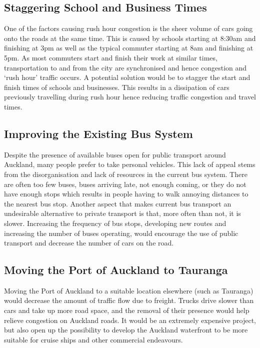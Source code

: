 \documentclass[twoside, a4paper, 11pt]{article}
\begin{document}
\subsection{Staggering School and Business Times}
One of the factors causing rush hour congestion is the sheer volume of cars going onto the roads at the same time. This is caused by schools starting at 8:30am and finishing at 3pm as well as the typical commuter starting at 8am and finishing at 5pm. As most commuters start and finish their work at similar times, transportation to and from the city are synchronised and hence congestion and `rush hour' traffic occurs. A potential solution would be to stagger the start and finish times of schools and businesses. This results in a dissipation of cars previously travelling during rush hour hence reducing traffic congestion and travel times.

\subsection{Improving the Existing Bus System}
Despite the presence of available buses open for public transport around Auckland, many people prefer to take personal vehicles. This lack of appeal stems from the disorganisation and lack of resources in the current bus system. There are often too few buses, buses arriving late, not enough coming, or they do not have enough stops which results in people having to walk annoying distances to the nearest bus stop. Another aspect that makes current bus transport an undesirable alternative to private transport is that, more often than not, it is slower. Increasing the frequency of bus stops, developing new routes and increasing the number of buses operating, would encourage the use of public transport and decrease the number of cars on the road. 
 
\subsection{Moving the Port of Auckland to Tauranga}
Moving the Port of Auckland to a suitable location elsewhere (such as Tauranga) would decrease the amount of traffic flow due to freight. Trucks drive slower than cars and take up more road space, and the removal of their presence would help relieve congestion on Auckland roads. It would be an extremely expensive project, but also open up the possibility to develop the Auckland waterfront to be more suitable for cruise ships and other commercial endeavours.
 
\end{document}
